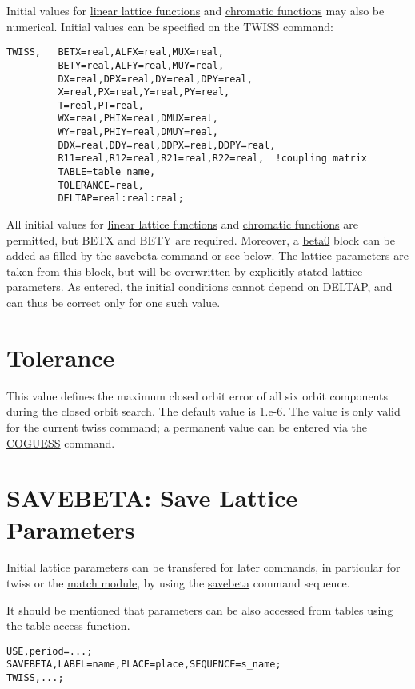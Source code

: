 Initial values for \href{../Introduction/tables.html#linear}{linear
  lattice functions} and
\href{../Introduction/tables.html#chrom}{chromatic functions} may also
be numerical. Initial values can be specified on the TWISS command:  
\begin{verbatim}
TWISS,   BETX=real,ALFX=real,MUX=real,
         BETY=real,ALFY=real,MUY=real,
         DX=real,DPX=real,DY=real,DPY=real,
         X=real,PX=real,Y=real,PY=real,
         T=real,PT=real,
         WX=real,PHIX=real,DMUX=real,
         WY=real,PHIY=real,DMUY=real,
         DDX=real,DDY=real,DDPX=real,DDPY=real,
         R11=real,R12=real,R21=real,R22=real,  !coupling matrix
         TABLE=table_name,
         TOLERANCE=real,
         DELTAP=real:real:real;
\end{verbatim}

All initial values for \href{../Introduction/tables.html#linear}{linear
  lattice functions} and
\href{../Introduction/tables.html#chrom}{chromatic functions} are
permitted, but BETX and BETY are required. Moreover, a
\href{beta0}{beta0} block can be added as filled by the
\href{../control/general.html#savebeta}{savebeta} command or see
below. The lattice parameters are taken from this block, but will be
overwritten by explicitly stated lattice parameters. As entered, the
initial conditions cannot depend on DELTAP, and can thus be correct only
for one such value.  

\section{Tolerance}

This value defines the maximum closed orbit error of all six orbit
components during the closed orbit search. The default value is
1.e-6. The value is only valid for the current twiss command; a
permanent value can be entered via the
\href{../control/general.html#coguess}{COGUESS} command.  

\section{SAVEBETA: Save Lattice Parameters}

Initial lattice parameters can be transfered for later commands, in
particular for twiss or the \href{../match/match.html}{match module}, by
using the \href{../control/general.html#savebeta}{savebeta} command
sequence.  

It should be mentioned that parameters can be also accessed from tables
using the \href{../Introduction/expression.html#table}{table access}
function. 
\begin{verbatim}
USE,period=...;
SAVEBETA,LABEL=name,PLACE=place,SEQUENCE=s_name;
TWISS,...;
\end{verbatim}

